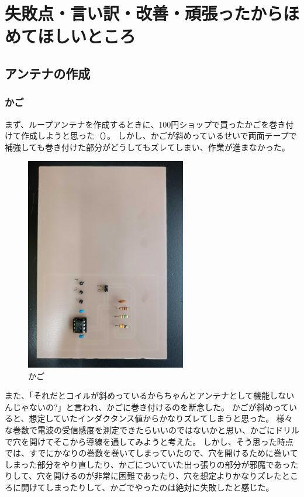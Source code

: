 \documentclass[report.tex]{subfiles}
\begin{document}
\section{失敗点・言い訳・改善・頑張ったからほめてほしいところ}

\subsection{アンテナの作成}

\subsubsection{かご}

まず、ループアンテナを作成するときに、100円ショップで買ったかごを巻き付けて作成しようと思った（）。
しかし、かごが斜めっているせいで両面テープで補強しても巻き付けた部分がどうしてもズレてしまい、作業が進まなかった。

\begin{figure}[H]
	\centering
	\includegraphics[width=7cm]{use/1.jpg}
	\caption{かご}
	\label{fig:kago}
\end{figure}

また、「それだとコイルが斜めっているからちゃんとアンテナとして機能しないんじゃないの?」と言われ、かごに巻き付けるのを断念した。
かごが斜めっていると、想定していたインダクタンス値からかなりズレてしまうと思った。
様々な巻数で電波の受信感度を測定できたらいいのではないかと思い、かごにドリルで穴を開けてそこから導線を通してみようと考えた。
しかし、そう思った時点では、すでにかなりの巻数を巻いてしまっていたので、穴を開けるために巻いてしまった部分をやり直したり、かごについていた出っ張りの部分が邪魔であったりして、穴を開けるのが非常に困難であったり、穴を想定よりかなりズレたところに開けてしまったりして、かごでやったのは絶対に失敗したと感じた。
\end{document}
